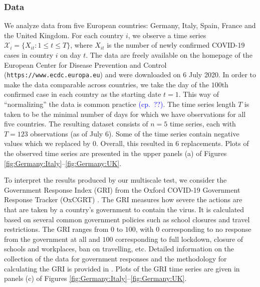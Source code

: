 \documentclass[a4paper,12pt]{article}
\numberwithin{equation}{section}
\begin{document}



\subsubsection{Data}


We analyze data from five European countries: Germany, Italy, Spain, France and the United Kingdom. For each country $i$, we observe a time series $\mathcal{X}_i = \{ X_{it}: 1 \le t \le T \}$, where $X_{it}$ is the number of newly confirmed COVID-19 cases in country $i$ on day $t$. The data are freely available on the homepage of the European Center for Disease Prevention and Control (\texttt{https://www.ecdc.europa.eu}) and were downloaded on 6 July 2020. In order to make the data comparable across countries, we take the day of the $100$th confirmed case in each country as the starting date $t=1$. This way of ``normalizing'' the data is common practice \textcolor{blue}{(cp.\ ??)}. The time series length $T$ is taken to be the minimal number of days for which we have observations for all five countries. The resulting dataset consists of $n = 5$ time series, each with $T = 123$ observations (as of July 6). Some of the time series contain negative values which we replaced by $0$. Overall, this resulted in $6$ replacements. Plots of the observed time series are presented in the upper panels (a) of Figures \ref{fig:Germany:Italy}--\ref{fig:Germany:UK}.


To interpret the results produced by our multiscale test, we consider the Government Response Index (GRI) from the Oxford COVID-19 Government Response Tracker (OxCGRT) \citep{Hale2020}. The GRI measures how severe the actions are that are taken by a country's government to contain the virus. It is calculated based on several common government policies such as school closures and travel restrictions. The GRI ranges from $0$ to $100$, with $0$ corresponding to no response from the government at all and $100$ corresponding to full lockdown, closure of schools and workplaces, ban on travelling, etc. Detailed information on the collection of the data for government responses and the methodology for calculating the GRI is provided in \cite{Hale2020paper}. Plots of the GRI time series are given in panels (c) of Figures \ref{fig:Germany:Italy}--\ref{fig:Germany:UK}.
\end{document}
